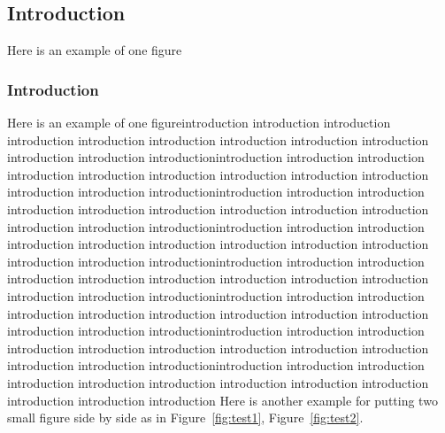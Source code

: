 \subsection{Introduction}
Here is an example of one figure
\subsubsection{Introduction}
Here is an example of one figureintroduction introduction introduction introduction introduction introduction introduction introduction introduction introduction introduction introductionintroduction introduction introduction introduction introduction introduction introduction introduction introduction introduction introduction introductionintroduction introduction introduction introduction introduction introduction introduction introduction introduction introduction introduction introductionintroduction introduction introduction introduction introduction introduction introduction introduction introduction introduction introduction introductionintroduction introduction introduction introduction introduction introduction introduction introduction introduction introduction introduction introductionintroduction introduction introduction introduction introduction introduction introduction introduction introduction introduction introduction introductionintroduction introduction introduction introduction introduction introduction introduction introduction introduction introduction introduction introductionintroduction introduction introduction introduction introduction introduction introduction introduction introduction introduction introduction introduction
Here is another example for putting two small figure side by side as in Figure~\ref{fig:test1}, Figure~\ref{fig:test2}.

